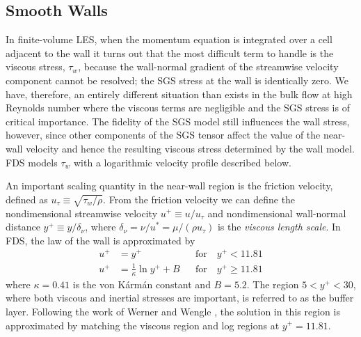 \subsection{Smooth Walls}
\label{smooth_wall_model}

In finite-volume LES, when the momentum equation is integrated over a cell adjacent to the wall it turns out that the most difficult term to handle is the viscous stress, $\tau_w$, because the wall-normal gradient of the streamwise velocity component cannot be resolved; the SGS stress at the wall is identically zero.  We have, therefore, an entirely different situation than exists in the bulk flow at high Reynolds number where the viscous terms are negligible and the SGS stress is of critical importance.  The fidelity of the SGS model still influences the wall stress, however, since other components of the SGS tensor affect the value of the near-wall velocity and hence the resulting viscous stress determined by the wall model. FDS models $\tau_w$ with a logarithmic velocity profile \cite{Pope:2000} described below.

An important scaling quantity in the near-wall region is the friction velocity, defined as $u_\tau \equiv \sqrt{\tau_w/\rho}$.
From the friction velocity we can define the nondimensional streamwise velocity $u^+ \equiv u/u_\tau$ and nondimensional wall-normal distance $y^+ \equiv y/\delta_\nu$, where $\delta_\nu = \nu/u^* = \mu/(\rho u_\tau)$ is the \emph{viscous length scale}. In FDS, the law of the wall is approximated by
\begin{align}
\label{eqn_visclayer} u^+ &= y^+                           && \mbox{for} \quad y^+ < 11.81 \\
\label{eqn_loglaw}    u^+ &= \frac{1}{\kappa} \ln y^+ + B  && \mbox{for} \quad y^+ \ge 11.81
\end{align}
where $\kappa = 0.41$ is the von K\'arm\'an constant and $B=5.2$.  The region $5 < y^+ < 30$, where both viscous and inertial stresses are important, is referred to as the buffer layer.  Following the work of Werner and Wengle \cite{Werner:1991}, the solution in this region is approximated by matching the viscous region and log regions at $y^+ = 11.81$.


